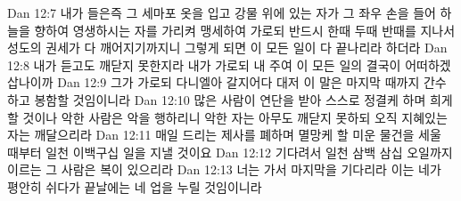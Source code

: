 Dan 12:7  내가 들은즉 그 세마포 옷을 입고 강물 위에 있는 자가 그 좌우 손을 들어 하늘을 향하여 영생하시는 자를 가리켜 맹세하여 가로되 반드시 한때 두때 반때를 지나서 성도의 권세가 다 깨어지기까지니 그렇게 되면 이 모든 일이 다 끝나리라 하더라
Dan 12:8  내가 듣고도 깨닫지 못한지라 내가 가로되 내 주여 이 모든 일의 결국이 어떠하겠삽나이까
Dan 12:9  그가 가로되 다니엘아 갈지어다 대저 이 말은 마지막 때까지 간수하고 봉함할 것임이니라
Dan 12:10  많은 사람이 연단을 받아 스스로 정결케 하며 희게 할 것이나 악한 사람은 악을 행하리니 악한 자는 아무도 깨닫지 못하되 오직 지혜있는 자는 깨달으리라
Dan 12:11  매일 드리는 제사를 폐하며 멸망케 할 미운 물건을 세울 때부터 일천 이백구십 일을 지낼 것이요
Dan 12:12  기다려서 일천 삼백 삼십 오일까지 이르는 그 사람은 복이 있으리라
Dan 12:13  너는 가서 마지막을 기다리라 이는 네가 평안히 쉬다가 끝날에는 네 업을 누릴 것임이니라


